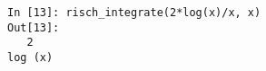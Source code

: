 ﻿\documentclass{article}
\begin{document}
\normalsize
\begin{Verbatim}
In [13]: risch_integrate(2*log(x)/x, x)
Out[13]: 
   2   
log (x)
\end{Verbatim}
\end{document}
